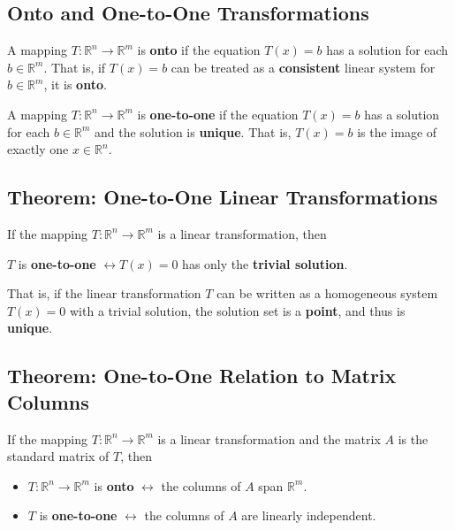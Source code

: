 \documentclass[12pt, letterpaper]{article}
\begin{document}
\subsection*{Onto and One-to-One Transformations}

A mapping $ T: \mathbb{R}^n \rightarrow \mathbb{R}^m $ is
\textbf{onto} if the equation $ T(x) = b $ has a solution for each $
b \in \mathbb{R}^m $. That is, if $ T(x) = b $ can be treated as a
\textbf{consistent} linear system for $ b \in \mathbb{R}^m $, it is
\textbf{onto}.
\bigskip

A mapping $ T: \mathbb{R}^n \rightarrow \mathbb{R}^m $ is
\textbf{one-to-one} if the equation $ T(x) = b $ has a solution for
each $ b \in \mathbb{R}^m $ and the solution is \textbf{unique}. That
is, $ T(x) = b $ is the image of exactly one $ x \in \mathbb{R}^n $.

\subsection*{Theorem: One-to-One Linear Transformations}

If the mapping $ T: \mathbb{R}^n \rightarrow \mathbb{R}^m $ is a
linear transformation, then

\medskip
{\centering

  $ T $ is \textbf{one-to-one} $ \leftrightarrow T(x) = 0 $ has only
  the \textbf{trivial solution}.

}
\medskip

That is, if the linear transformation $ T $ can be written as a
homogeneous system $ T(x) = 0 $ with a trivial solution, the solution
set is a \textbf{point}, and thus is \textbf{unique}.

\subsection*{Theorem: One-to-One Relation to Matrix Columns}

If the mapping $ T: \mathbb{R}^n \rightarrow \mathbb{R}^m $ is a
linear transformation and the matrix $ A $ is the standard matrix of $ T $, then

\begin{itemize}
  \item $ T: \mathbb{R}^n \rightarrow \mathbb{R}^m $ is \textbf{onto}
    $ \leftrightarrow $ the columns of $ A $ span $ \mathbb{R}^m $.
  \item $ T $ is \textbf{one-to-one} $ \leftrightarrow $ the columns
    of $ A $ are linearly independent.
\end{itemize}
\end{document}
